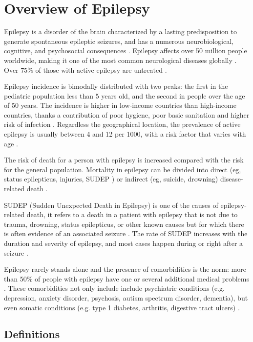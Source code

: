 \section{Overview of Epilepsy}
Epilepsy is a disorder of the brain characterized by a lasting predisposition to generate spontaneous epileptic seizures, and has a numerous neurobiological, cognitive, and psychosocial consequences \cite{defEpilepsy}.
Epilepsy affects over 50 million people worldwide, making it one of the most common neurological diseases globally \cite{WHO}. Over 75\% of those with active epilepsy are untreated \cite{defeating_epilepsy}.

Epilepsy incidence is bimodally distributed with two peaks: the first in the pediatric population less than 5 years old, and the second in people over the age of 50 years. The incidence is higher in low-income countries than high-income countries, thanks a contribution of poor hygiene, poor basic sanitation and higher risk of infection \cite{THIJS2019689}.
Regardless the geographical location, the prevalence of active epilepsy is usually between 4 and 12 per 1000, with a risk factor that varies with age \cite{Fiest296}.

The risk of death for a person with epilepsy is increased compared with the risk for the general population. Mortality in epilepsy can be divided into direct (eg, status epilepticus, injuries, SUDEP \cite{Langan211}) or indirect (eg, suicide, drowning) disease-related death \cite{Devinsky779}. 

\noindent SUDEP (Sudden Unexpected Death in Epilepsy) is one of the causes of epilepsy-related death, it refers to a death in a patient with epilepsy that is not due to trauma, drowning, status epilepticus, or other known causes but for which there is often evidence of an associated seizure \cite{Nashef1997}. The rate of SUDEP increases with the duration and severity of epilepsy, and most cases happen during or right after a seizure \cite{Devinsky2011}.

Epilepsy rarely stands alone and the presence of comorbidities is the norm: more than 50\% of people with epilepsy have one or several additional medical problems \cite{THIJS2019689}. These comorbidities not only include include psychiatric conditions (e.g. depression, anxiety disorder, psychosis, autism spectrum disorder, dementia), but even somatic conditions (e.g. type 1 diabetes, arthritis, digestive tract ulcers) \cite{yuen2018epilepsy}.

  \subsection*{Definitions}
